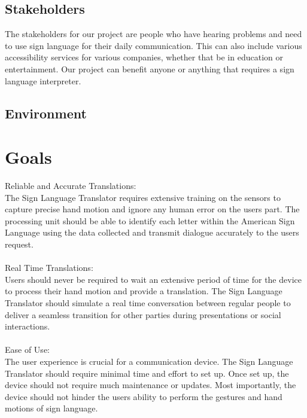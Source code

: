 \documentclass{article}
\begin{document}
\subsection{Stakeholders}

The stakeholders for our project are people who have hearing problems and need to use sign language for their daily
communication. This can also include various accessibility services for various companies, whether that be in education
or entertainment. Our project can benefit anyone or anything that requires a sign language interpreter.

\subsection{Environment}


\section{Goals}

Reliable and Accurate Translations:\\
The Sign Language Translator requires extensive training on the sensors to capture precise hand motion and ignore any
human error on the user\textquotesingle s part. The processing unit should be able to identify each letter within the American Sign Language
using the data collected and transmit dialogue accurately to the user\textquotesingle s request.\\

~\\Real Time Translations:\\
User\textquotesingle s should never be required to wait an extensive period of time for the device to process their hand motion and provide
a translation. The Sign Language Translator should simulate a real time conversation between regular people to deliver a seamless
transition for other parties during presentations or social interactions.\\

~\\Ease of Use:\\
The user experience is crucial for a communication device. The Sign Language Translator should require minimal time 
and effort to set up. Once set up, the device should not require much maintenance or updates. Most importantly,
the device should not hinder the user\textquotesingle s ability to perform the gestures and hand motions of sign language.\\
\end{document}
